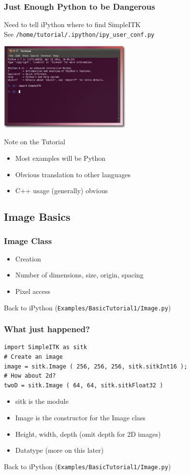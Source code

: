 \begin{frame}[fragile]
\frametitle{Just Enough Python to be Dangerous}
Need to tell iPython where to find SimpleITK\\
See \texttt{/home/tutorial/.ipython/ipy\_user\_conf.py}
\begin{center}
  \includegraphics[width=0.5\textwidth]{Images/iPythonWithSimpleITK_shadow}
\end{center}
\end{frame}

\begin{frame}{Note on the Tutorial}
\begin{itemize}
  \item Most examples will be Python
  \item Obvious translation to other languages
  \item C++ usage (generally) obvious
\end{itemize}
\end{frame}

\subsection{Image Basics}

\begin{frame}
\frametitle{Image Class}
\begin{itemize}
  \item Creation
  \item Number of dimensions, size, origin, spacing
  \item Pixel access
\end{itemize}
Back to iPython (\texttt{Examples/BasicTutorial1/Image.py})
\end{frame}

\begin{frame}[fragile]
\frametitle{What just happened?}
\lstpython
\begin{lstlisting}
import SimpleITK as sitk
# Create an image
image = sitk.Image ( 256, 256, 256, sitk.sitkInt16 );
# How about 2d?
twoD = sitk.Image ( 64, 64, sitk.sitkFloat32 )
\end{lstlisting}

\begin{itemize}
  \item sitk is the module
  \item Image is the constructor for the Image class
  \item Height, width, depth (omit depth for 2D images)
  \item Datatype (more on this later)
\end{itemize}
Back to iPython (\texttt{Examples/BasicTutorial1/Image.py})
\end{frame}


